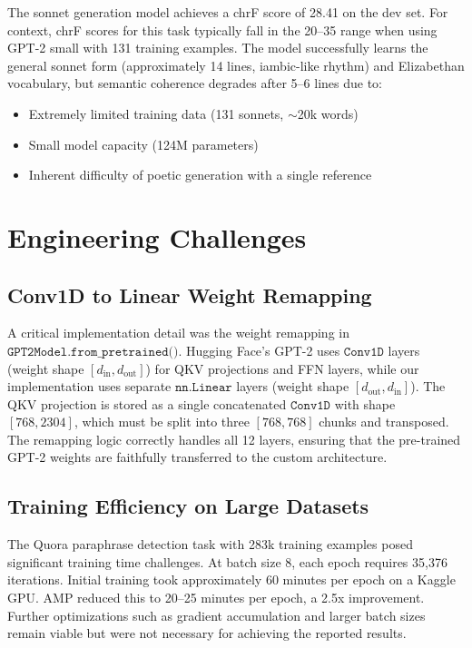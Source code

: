 \documentclass[11pt,a4paper]{article}
\begin{document}
The sonnet generation model achieves a chrF score of 28.41 on the dev set. For context, chrF scores for this task typically fall in the 20--35 range when using GPT-2 small with 131 training examples. The model successfully learns the general sonnet form (approximately 14 lines, iambic-like rhythm) and Elizabethan vocabulary, but semantic coherence degrades after 5--6 lines due to:
\begin{itemize}[nosep]
  \item Extremely limited training data (131 sonnets, $\sim$20k words)
  \item Small model capacity (124M parameters)
  \item Inherent difficulty of poetic generation with a single reference
\end{itemize}

\section{Engineering Challenges}

\subsection{Conv1D to Linear Weight Remapping}

A critical implementation detail was the weight remapping in $\texttt{GPT2Model.from\_pretrained()}$. Hugging Face's GPT-2 uses $\texttt{Conv1D}$ layers (weight shape $[d_{\text{in}}, d_{\text{out}}]$) for QKV projections and FFN layers, while our implementation uses separate $\texttt{nn.Linear}$ layers (weight shape $[d_{\text{out}}, d_{\text{in}}]$). The QKV projection is stored as a single concatenated $\texttt{Conv1D}$ with shape $[768, 2304]$, which must be split into three $[768, 768]$ chunks and transposed. The remapping logic correctly handles all 12 layers, ensuring that the pre-trained GPT-2 weights are faithfully transferred to the custom architecture.

\subsection{Training Efficiency on Large Datasets}

The Quora paraphrase detection task with 283k training examples posed significant training time challenges. At batch size 8, each epoch requires 35,376 iterations. Initial training took approximately 60 minutes per epoch on a Kaggle GPU. AMP reduced this to 20--25 minutes per epoch, a 2.5x improvement. Further optimizations such as gradient accumulation and larger batch sizes remain viable but were not necessary for achieving the reported results.
\end{document}
